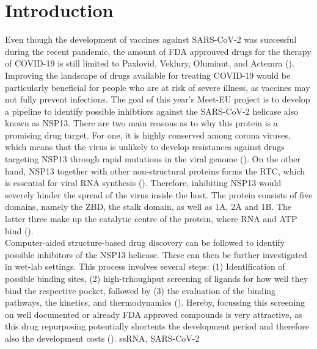 \documentclass[11pt, letterpaper, titlepage]{article}
\begin{document}
\section{Introduction}
Even though the development of vaccines against SARS-CoV-2 was successful during the recent pandemic, the amount of FDA approuved drugs for the therapy of COVID-19 is still limited to Paxlovid, Veklury, Olumiant, and Actemra (\cite{FDA_COVID}). Improving the landscape of drugs available for treating COVID-19 would be particularly beneficial for people who are at risk of severe illness, as vaccines may not fully prevent infections. The goal of this year's Meet-EU project is to develop a pipeline to identify possible inhibtiors against the SARS-CoV-2 helicase also known as \ac{NSP13}. There are two main reasons as to why this protein is a promising drug target. For one, it is highly conserved among corona viruses, which means that the virus is unlikely to develop resistances against drugs targeting \ac{NSP13} through rapid mutations in the viral genome (\cite{Spratt_2021}). On the other hand, \ac{NSP13} together with other non-structural proteins forms the \ac{RTC}, which is essential for viral RNA synthesis (\cite{Malone_2022}). Therefore, inhibiting \ac{NSP13} would severely hinder the spread of the virus inside the host. 
The protein consists of five domains, namely the \ac{ZBD}, the stalk domain, as well as 1A, 2A and 1B. The latter three make up the catalytic centre of the protein, where RNA and ATP bind (\cite{NSP13_basics}). \\
Computer-aided structure-based drug discovery can be followed to identify possible inhibitors of the \ac{NSP13} helicase. These can then be further investigated in wet-lab settings. This process involves several steps: (1) Identification of possible binding sites, (2) high-trhoughput screening of ligands for how well they bind the respective pocket, followed by (3) the evaluation of the binding pathways, the kinetics, and thermodynamics (\cite{Sledz_2018}). Hereby, focussing this screening on well documented or already FDA approved compounds is very attractive, as this drug repurposing potentially shortents the development period and therefore also the development costs (\cite{Pushpakom_2019}).
\ac{ssRNA}, \ac{SARS-CoV-2}
\subsection*{}
\end{document}
